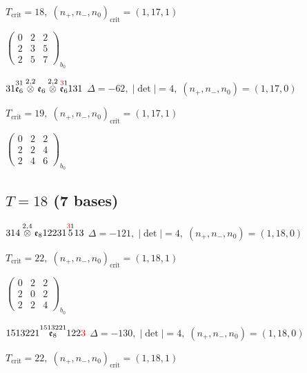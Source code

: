 \documentclass[10pt]{article}
\begin{document}
\hspace{1em}$T_{\text{crit}}=18,\; (n_+,n_-,n_0)_{\text{crit}}=(1,17,1)$

\hspace{2em}$\left(\begin{smallmatrix}0 & 2 & 2 \\ 2 & 3 & 5 \\ 2 & 5 & 7\end{smallmatrix}\right)_{\!b_0}$

$31\overset{31}{\mathfrak{e}_6}\overset{2,2}{\otimes}\mathfrak{e}_6\overset{2,2}{\otimes}\overset{\textcolor{red}{3}1}{\mathfrak{e}_6}131$ \quad $\Delta=-62,\; |\det|=4,\; (n_+,n_-,n_0)=(1,17,0)$

\hspace{1em}$T_{\text{crit}}=19,\; (n_+,n_-,n_0)_{\text{crit}}=(1,17,1)$

\hspace{2em}$\left(\begin{smallmatrix}0 & 2 & 2 \\ 2 & 2 & 4 \\ 2 & 4 & 6\end{smallmatrix}\right)_{\!b_0}$


\subsection*{$T = 18$ \quad (7 bases)}
\smallskip

$314\overset{2,4}{\otimes}\mathfrak{e}_812231\overset{\textcolor{red}{3}1}{5}13$ \quad $\Delta=-121,\; |\det|=4,\; (n_+,n_-,n_0)=(1,18,0)$

\hspace{1em}$T_{\text{crit}}=22,\; (n_+,n_-,n_0)_{\text{crit}}=(1,18,1)$

\hspace{2em}$\left(\begin{smallmatrix}0 & 2 & 2 \\ 2 & 0 & 2 \\ 2 & 2 & 4\end{smallmatrix}\right)_{\!b_0}$

\smallskip

$1513221\overset{1513221}{\mathfrak{e}_8}122\textcolor{red}{3}$ \quad $\Delta=-130,\; |\det|=4,\; (n_+,n_-,n_0)=(1,18,0)$

\hspace{1em}$T_{\text{crit}}=22,\; (n_+,n_-,n_0)_{\text{crit}}=(1,18,1)$
\end{document}
